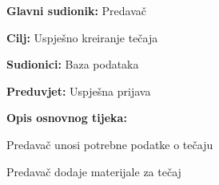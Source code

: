 				\noindent {}
				\begin{packed_item}
					
					\item \textbf{Glavni sudionik:} Predavač
					\item  \textbf{Cilj:} Uspješno kreiranje tečaja
					\item  \textbf{Sudionici:} Baza podataka
					\item  \textbf{Preduvjet:} Uspješna prijava
					\item  \textbf{Opis osnovnog tijeka:}
					
					\item[] \begin{packed_enum}
						
						\item Predavač unosi potrebne podatke o tečaju
						\item Predavač dodaje materijale za tečaj
						
					\end{packed_enum}
					
				\end{packed_item}
			
